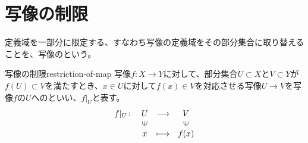 \documentclass[../../../topic_linear-algebra]{subfiles}
\begin{document}
\sectionline
\section{写像の制限}

定義域を一部分に限定する、すなわち写像の定義域をその部分集合に取り替えることを、写像のという。

\begin{definition}{写像の制限}{restriction-of-map}
  写像$f\colon X \to Y$に対して、部分集合$U \subset X$と$V \subset Y$が$f(U) \subset V$を満たすとき、$x \in U$に対して$f(x) \in V$を対応させる写像$U \to V$を写像$f$の$U$へのといい、$f|_U$と表す。
  \begin{equation*}
  \begin{array}{lclc}
    f|_U \colon & U         & \longrightarrow & V          \\
            & \rotatebox{90}{$\in$} &                 & \rotatebox{90}{$\in$} \\
            & x              & \longmapsto     & f(x)
  \end{array}
\end{equation*}
\end{definition}
\end{document}
